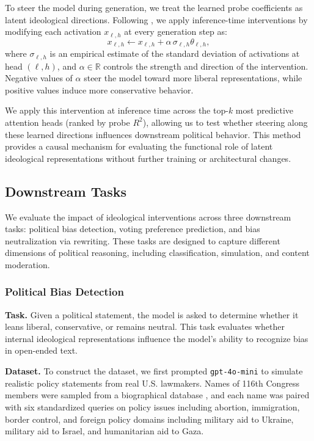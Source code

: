 \documentclass[11pt]{article}
\begin{document}
To steer the model during generation, we treat the learned probe coefficients as latent ideological directions. Following \citet{liInferenceTimeInterventionEliciting2023}, we apply inference-time interventions by modifying each activation \(x_{\ell,h}\) at every generation step as:
\[
x_{\ell,h} \leftarrow x_{\ell,h} + \alpha \, \sigma_{\ell,h} \theta_{\ell,h},
\]
where \(\sigma_{\ell,h}\) is an empirical estimate of the standard deviation of activations at head \((\ell,h)\), and \(\alpha \in \mathbb{R}\) controls the strength and direction of the intervention. Negative values of \(\alpha\) steer the model toward more liberal representations, while positive values induce more conservative behavior.

We apply this intervention at inference time across the top-\(k\) most predictive attention heads (ranked by probe \(R^2\)), allowing us to test whether steering along these learned directions influences downstream political behavior. This method provides a causal mechanism for evaluating the functional role of latent ideological representations without further training or architectural changes.

\subsection{Downstream Tasks}

We evaluate the impact of ideological interventions across three downstream tasks: political bias detection, voting preference prediction, and bias neutralization via rewriting. These tasks are designed to capture different dimensions of political reasoning, including classification, simulation, and content moderation.

\subsubsection{Political Bias Detection}

\textbf{Task.} Given a political statement, the model is asked to determine whether it leans liberal, conservative, or remains neutral. This task evaluates whether internal ideological representations influence the model's ability to recognize bias in open-ended text.

\textbf{Dataset.} To construct the dataset, we first prompted \texttt{gpt-4o-mini} to simulate realistic policy statements from real U.S. lawmakers. Names of 116th Congress members were sampled from a biographical database \citep{kimLinearRepresentationsPolitical2025}, and each name was paired with six standardized queries on policy issues including abortion, immigration, border control, and foreign policy domains including military aid to Ukraine, military aid to Israel, and humanitarian aid to Gaza.
\end{document}
